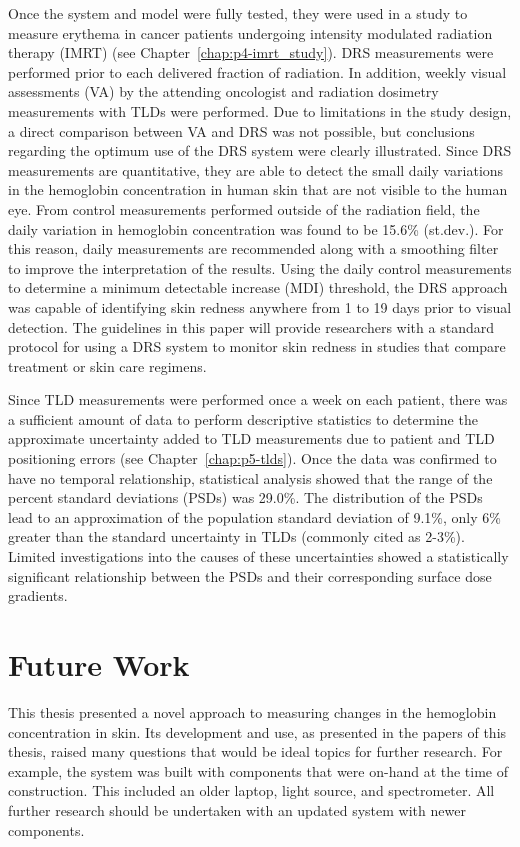 Once the system and model were fully tested, they were used in a study to measure erythema in cancer patients undergoing intensity modulated radiation therapy (IMRT) (see Chapter~\ref{chap:p4-imrt_study}). DRS measurements were performed prior to each delivered fraction of radiation. In addition, weekly visual assessments (VA) by the attending oncologist and radiation dosimetry measurements with TLDs were performed. Due to limitations in the study design, a direct comparison between VA and DRS was not possible, but conclusions regarding the optimum use of the DRS system were clearly illustrated. Since DRS measurements are quantitative, they are able to detect the small daily variations in the hemoglobin concentration in human skin that are not visible to the human eye. From control measurements performed outside of the radiation field, the daily variation in hemoglobin concentration was found to be 15.6\% (st.dev.). For this reason, daily measurements are recommended along with a smoothing filter to improve the interpretation of the results. Using the daily control measurements to determine a minimum detectable increase (MDI) threshold, the DRS approach was capable of identifying skin redness anywhere from 1 to 19 days prior to visual detection. The guidelines in this paper will provide researchers with a standard protocol for using a DRS system to monitor skin redness in studies that compare treatment or skin care regimens.

Since TLD measurements were performed once a week on each patient, there was a sufficient amount of data to perform descriptive statistics to determine the approximate uncertainty added to TLD measurements due to patient and TLD positioning errors (see Chapter~\ref{chap:p5-tlds}). Once the data was confirmed to have no temporal relationship, statistical analysis showed that the range of the percent standard deviations (PSDs) was 29.0\%. The distribution of the PSDs lead to an approximation of the population standard deviation of 9.1\%, only 6\% greater than the standard uncertainty in TLDs (commonly cited as 2-3\%). Limited investigations into the causes of these uncertainties showed a statistically significant relationship between the PSDs and their corresponding surface dose gradients.

\section{Future Work}
This thesis presented a novel approach to measuring changes in the hemoglobin concentration in skin. Its development and use, as presented in the papers of this thesis, raised many questions that would be ideal topics for further research. For example, the system was built with components that were on-hand at the time of construction. This included an older laptop, light source, and spectrometer. All further research should be undertaken with an updated system with newer components.

